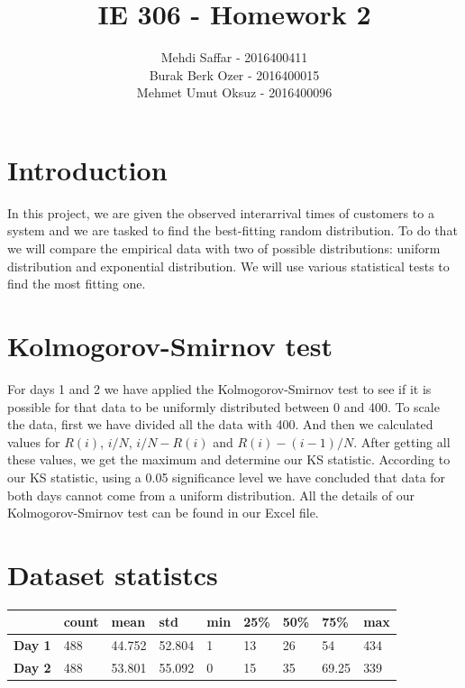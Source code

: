 \documentclass{article}
\title{IE 306 - Homework 2}
\author{Mehdi Saffar - 2016400411 \\ Burak Berk Ozer - 2016400015 \\ Mehmet Umut Oksuz - 2016400096}
\begin{document}
\maketitle

\section{Introduction}
In this project, we are given the observed interarrival times of customers to a
system and we are tasked to find the best-fitting random distribution. To do
that we will compare the empirical data with two of possible distributions:
uniform distribution and exponential distribution. We will use various
statistical tests to find the most fitting one.

\section{Kolmogorov-Smirnov test}
For days 1 and 2 we have applied the Kolmogorov-Smirnov test to see if it is
possible for that data to be uniformly distributed between 0 and 400. To scale
the data, first we have divided all the data with 400. And then we calculated
values for $R(i)$, $i/N$, $i/N-R(i)$ and  $R(i)-(i-1)/N$. After getting all these
values, we get the maximum and determine our KS statistic. According to our KS
statistic, using a 0.05 significance level we have concluded that data for both
days cannot come from a uniform distribution. All the details of our
Kolmogorov-Smirnov test can be found in our Excel file.
\section{Dataset statistcs}

\begin{table}[H]
    \centering
    \begin{tabular}{@{}lllllllll@{}}
        \toprule
                       & \textbf{count} & \textbf{mean} & \textbf{std} & \textbf{min} & \textbf{25\%} & \textbf{50\%} & \textbf{75\%} & \textbf{max} \\ \midrule
        \textbf{Day 1} & 488            & 44.752        & 52.804       & 1            & 13            & 26            & 54            & 434          \\
        \textbf{Day 2} & 488            & 53.801        & 55.092       & 0            & 15            & 35            & 69.25         & 339          \\ \bottomrule
    \end{tabular}
\end{table}
\end{document}
